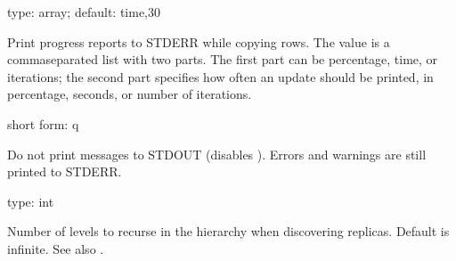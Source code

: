\documentclass[letterpaper,10pt,english]{sphinxmanual}
\begin{document}
\begin{fulllineitems}
\label{\detokenize{mariadb-schema-change:cmdoption-mariadb-schema-change-progress}}
type: array; default: time,30

Print progress reports to STDERR while copying rows.  The value is a
comma\sphinxhyphen{}separated list with two parts.  The first part can be percentage, time, or
iterations; the second part specifies how often an update should be printed, in
percentage, seconds, or number of iterations.

\end{fulllineitems}


\begin{fulllineitems}
\label{\detokenize{mariadb-schema-change:cmdoption-mariadb-schema-change-quiet}}
short form: \sphinxhyphen{}q

Do not print messages to STDOUT (disables {\hyperref[\detokenize{mariadb-schema-change:cmdoption-mariadb-schema-change-progress}]{}}).
Errors and warnings are still printed to STDERR.

\end{fulllineitems}


\begin{fulllineitems}
\label{\detokenize{mariadb-schema-change:cmdoption-mariadb-schema-change-recurse}}
type: int

Number of levels to recurse in the hierarchy when discovering replicas.
Default is infinite.  See also {\hyperref[\detokenize{mariadb-schema-change:cmdoption-mariadb-schema-change-recursion-method}]{}}.

\end{fulllineitems}
\end{document}
